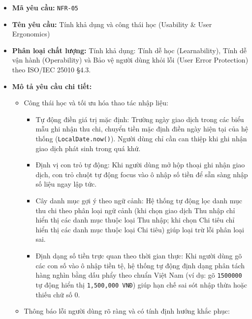 \documentclass[11pt,a4paper]{article}
\providecommand{\tightlist}{
  \setlength{\itemsep}{0pt}\setlength{\parskip}{0pt}}
\begin{document}
\begin{itemize}
\tightlist
\item
  \textbf{Mã yêu cầu:} \texttt{NFR-05}
\item
  \textbf{Tên yêu cầu:} Tính khả dụng và công thái học (Usability \&
  User Ergonomics)
\item
  \textbf{Phân loại chất lượng:} Tính khả dụng: Tính dễ học
  (Learnability), Tính dễ vận hành (Operability) và Bảo vệ người dùng
  khỏi lỗi (User Error Protection) theo ISO/IEC 25010 §4.3.
\item
  \textbf{Mô tả yêu cầu chi tiết:}

  \begin{itemize}
  \tightlist
  \item
    Công thái học và tối ưu hóa thao tác nhập liệu:

    \begin{itemize}
    \tightlist
    \item
      Tự động điền giá trị mặc định: Trường ngày giao dịch trong các
      biểu mẫu ghi nhận thu chi, chuyển tiền mặc định điền ngày hiện tại
      của hệ thống (\texttt{LocalDate.now()}). Người dùng chỉ cần can
      thiệp khi ghi nhận giao dịch phát sinh trong quá khứ.
    \item
      Định vị con trỏ tự động: Khi người dùng mở hộp thoại ghi nhận giao
      dịch, con trỏ chuột tự động focus vào ô nhập số tiền để sẵn sàng
      nhập số liệu ngay lập tức.
    \item
      Cây danh mục gợi ý theo ngữ cảnh: Hệ thống tự động lọc danh mục
      thu chi theo phân loại ngữ cảnh (khi chọn giao dịch Thu nhập chỉ
      hiển thị các danh mục thuộc loại Thu nhập; khi chọn Chi tiêu chỉ
      hiển thị các danh mục thuộc loại Chi tiêu) giúp loại trừ lỗi phân
      loại sai.
    \item
      Định dạng số tiền trực quan theo thời gian thực: Khi người dùng gõ
      các con số vào ô nhập tiền tệ, hệ thống tự động định dạng phân
      tách hàng nghìn bằng dấu phẩy theo chuẩn Việt Nam (ví dụ: gõ
      \texttt{1500000} tự động hiển thị \texttt{1,500,000\ VNĐ}) giúp
      hạn chế sai sót nhập thừa hoặc thiếu chữ số 0.
    \end{itemize}
  \item
    Thông báo lỗi người dùng rõ ràng và có tính định hướng khắc phục:


\end{itemize}
\end{itemize}
\end{document}

